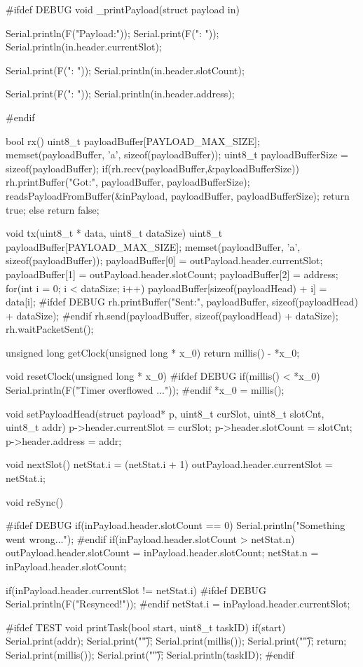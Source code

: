 #ifdef DEBUG
void _printPayload(struct payload in) {
    Serial.println(F("Payload:"));
    Serial.print(F("\tcurrentSlot: "));
    Serial.println(in.header.currentSlot);

    Serial.print(F("\tslotCount: "));
    Serial.println(in.header.slotCount);

    Serial.print(F("\taddress: "));
    Serial.println(in.header.address);
}
#endif

bool rx() {
    uint8_t payloadBuffer[PAYLOAD_MAX_SIZE];
    memset(payloadBuffer, 'a', sizeof(payloadBuffer));
    uint8_t payloadBufferSize = sizeof(payloadBuffer);
    if(rh.recv(payloadBuffer,&payloadBufferSize)) {
        rh.printBuffer("Got:", payloadBuffer, payloadBufferSize);
        readsPayloadFromBuffer(&inPayload, payloadBuffer, payloadBufferSize);
        return true;
    } else {
        return false;
    }
}

void tx(uint8_t * data, uint8_t dataSize) {
    uint8_t payloadBuffer[PAYLOAD_MAX_SIZE];
    memset(payloadBuffer, 'a', sizeof(payloadBuffer));
    payloadBuffer[0] = outPayload.header.currentSlot;
    payloadBuffer[1] = outPayload.header.slotCount;
    payloadBuffer[2] = address;
    for(int i = 0; i < dataSize; i++) {
        payloadBuffer[sizeof(payloadHead) + i] = data[i];
    }
#ifdef DEBUG
    rh.printBuffer("Sent:", payloadBuffer, sizeof(payloadHead) + dataSize);
#endif
    rh.send(payloadBuffer, sizeof(payloadHead) + dataSize);
    rh.waitPacketSent();
}

unsigned long getClock(unsigned long * x_0){
    return millis() - *x_0; 
}

void resetClock(unsigned long * x_0) {
#ifdef DEBUG
    if(millis() < *x_0)
        Serial.println(F("Timer overflowed ..."));
#endif
    *x_0 = millis();
}

void setPayloadHead(struct payload* p, uint8_t curSlot, uint8_t slotCnt, uint8_t addr){
    p->header.currentSlot = curSlot;
    p->header.slotCount = slotCnt;
    p->header.address = addr;  
}

void nextSlot(){
    netStat.i = (netStat.i + 1) %
    outPayload.header.currentSlot = netStat.i;  
}

void reSync(){
#ifdef DEBUG
    if(inPayload.header.slotCount == 0)
        Serial.println("Something went wrong...");
#endif
    if(inPayload.header.slotCount > netStat.n) {
      outPayload.header.slotCount = inPayload.header.slotCount;
      netStat.n = inPayload.header.slotCount;
    }

    if(inPayload.header.currentSlot != netStat.i) {
#ifdef DEBUG
        Serial.println(F("Resynced!"));
#endif
        netStat.i = inPayload.header.currentSlot;
    }
}

#ifdef TEST
void printTask(bool start, uint8_t taskID){
    if(start) {
        Serial.print(addr);
        Serial.print("\t");
        Serial.print(millis());
        Serial.print("\t");
        return;
    }
    Serial.print(millis());
    Serial.print("\t");
    Serial.println(taskID);
}
#endif